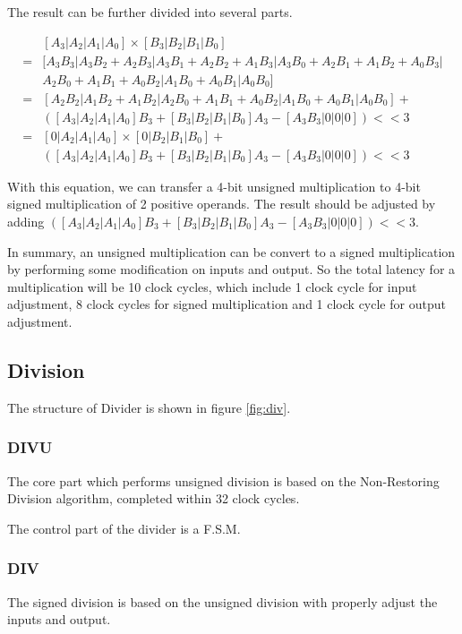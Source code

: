 The result can be further divided into several parts.

\begin{align*}
&[A_3|A_2|A_1|A_0] \times [B_3|B_2|B_1|B_0]\\
=&[A_3B_3|A_3B_2+A_2B_3|A_3B_1+A_2B_2+A_1B_3|A_3B_0+A_2B_1+A_1B_2+A_0B_3|\\
 &A_2B_0+A_1B_1+A_0B_2|A_1B_0+A_0B_1|A_0B_0]\\
=&[A_2B_2|A_1B_2+A_1B_2|A_2B_0+A_1B_1+A_0B_2|A_1B_0+A_0B_1|A_0B_0]+\\
 &([A_3|A_2|A_1|A_0]B_3+[B_3|B_2|B_1|B_0]A_3-[A_3B_3|0|0|0]) << 3\\
=&[0|A_2|A_1|A_0] \times [0|B_2|B_1|B_0]+\\
 &([A_3|A_2|A_1|A_0]B_3+[B_3|B_2|B_1|B_0]A_3-[A_3B_3|0|0|0]) << 3
\end{align*}

With this equation, we can transfer a 4-bit unsigned multiplication to 4-bit signed multiplication
of 2 positive operands. The result should be adjusted by adding $([A_3|A_2|A_1|A_0]B_3+[B_3|B_2|B_1|B_0]A_3-[A_3B_3|0|0|0]) << 3$.

In summary, an unsigned multiplication can be convert to a signed multiplication by
performing some modification on inputs and output. So the total latency for a multiplication
will be 10 clock cycles, which include 1 clock cycle for input adjustment, 8 clock cycles
for signed multiplication and 1 clock cycle for output adjustment.

\subsection[Division]{Division}
The structure of Divider is shown in figure \ref{fig:div}.

\subsubsection[DIVU]{DIVU}
The core part which performs unsigned division is based on the
Non-Restoring Division algorithm, completed within 32 clock cycles.

The control part of the divider is a F.S.M.

\subsubsection[DIV]{DIV}
The signed division is based on the unsigned division with properly adjust the inputs
and output.

